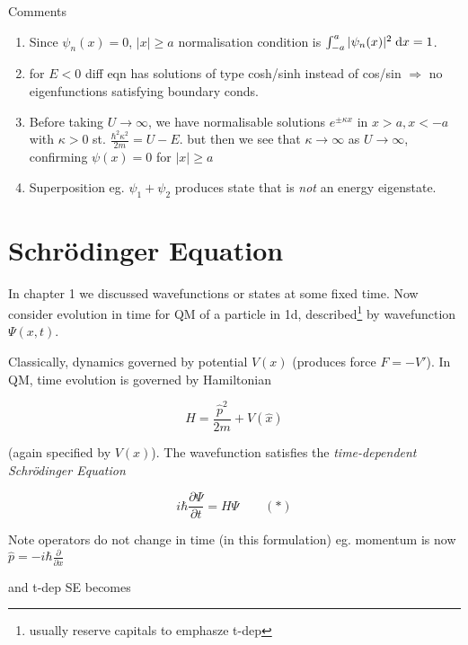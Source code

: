\documentclass[a4paper]{article}
\begin{document}
Comments 

\begin{enumerate}
	\item Since $ \psi_{n}(x) = 0 $, $ | x | \geq a $ normalisation condition is $ \int_{-a}^{a} | \psi_{n} (x) |^{2} \; \mathrm{d} x = 1 $.
	
	
	\item for $ E < 0 $ diff eqn has solutions of type cosh/sinh instead of cos/sin $ \Rightarrow $ no eigenfunctions satisfying boundary conds. 
	
	\item Before taking $ U \to \infty $, we have normalisable solutions $ e^{\pm \kappa x} $ in $ x > a, x < -a $ with $ \kappa > 0 $ st. $ \frac{\hbar^{2}\kappa^{2}}{2m} = U - E $. but then we see that $ \kappa \to \infty $ as $ U \to \infty $, confirming $ \psi(x) = 0 $ for $ | x | \geq a $
	
	\item Superposition eg. $ \psi_{1} + \psi_{2} $ produces state that is \emph{not} an energy eigenstate. 
\end{enumerate}

\section{Schr\"odinger Equation}

In chapter 1 we discussed wavefunctions or states at some fixed time. Now consider evolution in time for QM of a particle in 1d, described\footnote{usually reserve capitals to emphasze t-dep} by wavefunction $ \Psi(x,t) $.

Classically, dynamics governed by potential $ V(x) $ (produces force $ F = - V' $). In QM, time evolution is governed by Hamiltonian

\[ H = \frac{\hat{p}^{2}}{2m} + V(\hat{x}) \]

(again specified by $ V(x) $). The wavefunction satisfies the \emph{time-dependent Schr\"odinger Equation}

\[ i \hbar \frac{\partial \Psi }{\partial t} = H \Psi \qquad (*) \]

Note operators do not change in time (in this formulation) eg. momentum is now $ \hat{p} = -i \hbar \frac{\partial  }{\partial x} $


and t-dep SE becomes
\end{document}

